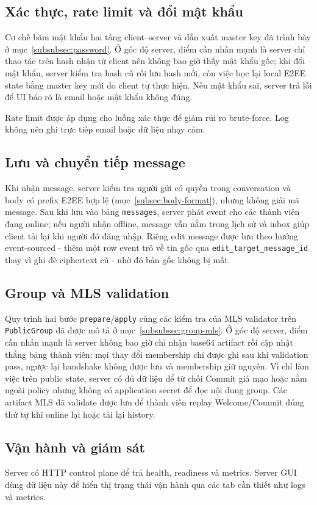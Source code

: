 \subsection{Xác thực, rate limit và đổi mật khẩu}

Cơ chế băm mật khẩu hai tầng client–server và dẫn xuất master key đã trình bày ở mục~\ref{subsubsec:password}. Ở góc độ server, điểm cần nhấn mạnh là server chỉ thao tác trên hash nhận từ client nên không bao giờ thấy mật khẩu gốc; khi đổi mật khẩu, server kiểm tra hash cũ rồi lưu hash mới, còn việc bọc lại local E2EE state bằng master key mới do client tự thực hiện. Nếu mật khẩu sai, server trả lỗi để UI báo rõ là email hoặc mật khẩu không đúng.

Rate limit được áp dụng cho luồng xác thực để giảm rủi ro brute-force. Log không nên ghi trực tiếp email hoặc dữ liệu nhạy cảm.

\subsection{Lưu và chuyển tiếp message}

Khi nhận message, server kiểm tra người gửi có quyền trong conversation và body có prefix E2EE hợp lệ (mục~\ref{subsec:body-format}), nhưng không giải mã message. Sau khi lưu vào bảng \texttt{messages}, server phát event cho các thành viên đang online; nếu người nhận offline, message vẫn nằm trong lịch sử và inbox giúp client tải lại khi người đó đăng nhập. Riêng edit message được lưu theo hướng event-sourced - thêm một row event trỏ về tin gốc qua \texttt{edit\_target\_message\_id} thay vì ghi đè ciphertext cũ - nhờ đó bản gốc không bị mất.

\subsection{Group và MLS validation}

Quy trình hai bước \texttt{prepare}/\texttt{apply} cùng các kiểm tra của MLS validator trên \texttt{PublicGroup} đã được mô tả ở mục~\ref{subsubsec:group-mls}. Ở góc độ server, điểm cần nhấn mạnh là server không bao giờ chỉ nhận base64 artifact rồi cập nhật thẳng bảng thành viên: mọi thay đổi membership chỉ được ghi sau khi validation pass, ngược lại handshake không được lưu và membership giữ nguyên. Vì chỉ làm việc trên public state, server có đủ dữ liệu để từ chối Commit giả mạo hoặc nằm ngoài policy nhưng không có application secret để đọc nội dung group. Các artifact MLS đã validate được lưu để thành viên replay Welcome/Commit đúng thứ tự khi online lại hoặc tải lại history.

\subsection{Vận hành và giám sát}

Server có HTTP control plane để trả health, readiness và metrics. Server GUI dùng dữ liệu này để hiển thị trạng thái vận hành qua các tab cần thiết như logs và metrics.

